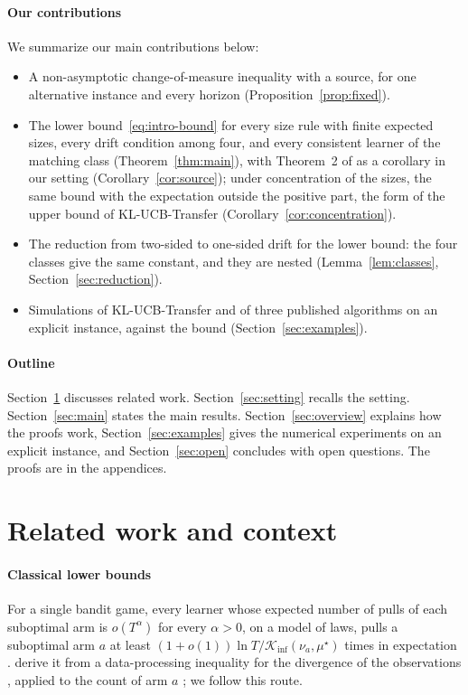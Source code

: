 \documentclass[11pt]{article}
\begin{document}
\paragraph{Our contributions} We summarize our main contributions below:
\begin{itemize}
\item A non-asymptotic change-of-measure inequality with a source, for one alternative instance
  and every horizon (Proposition~\ref{prop:fixed}).
\item The lower bound~\eqref{eq:intro-bound} for every size rule with finite expected sizes, every
  drift condition among four, and every consistent learner of the matching class
  (Theorem~\ref{thm:main}), with Theorem~2 of \citet{PMRM26} as a corollary in our setting
  (Corollary~\ref{cor:source}); under concentration of the sizes, the same bound with the
  expectation outside the positive part, the form of the upper bound of KL-UCB-Transfer
  (Corollary~\ref{cor:concentration}).
\item The reduction from two-sided to one-sided drift for the lower bound: the four classes give
  the same constant, and they are nested (Lemma~\ref{lem:classes}, Section~\ref{sec:reduction}).
\item Simulations of KL-UCB-Transfer \citep{PMRM26} and of three published algorithms on an
  explicit instance, against the bound (Section~\ref{sec:examples}).
\end{itemize}

\paragraph{Outline} Section~\ref{sec:related} discusses related work. Section~\ref{sec:setting}
recalls the setting. Section~\ref{sec:main} states the main results. Section~\ref{sec:overview}
explains how the proofs work, Section~\ref{sec:examples} gives the numerical experiments on an
explicit instance, and Section~\ref{sec:open} concludes with open questions. The proofs are in the
appendices.

\section{Related work and context}\label{sec:related}

\paragraph{Classical lower bounds} For a single bandit game, every learner whose expected number of
pulls of each suboptimal arm is $o(T^\alpha)$ for every $\alpha>0$, on a model of laws, pulls a
suboptimal arm $a$ at least $(1+o(1))\ln T/\mathcal K_{\inf}(\nu_a,\mu^\star)$ times in expectation
\citep{LR85,BK96}. \citet[Section~2]{GMS19} derive it from a data-processing inequality for the
divergence of the observations \citep[(6), Lemma~1]{GMS19}, applied to the count of arm $a$
\citep[Theorem~1, (10)--(11)]{GMS19}; we follow this route.
\end{document}
